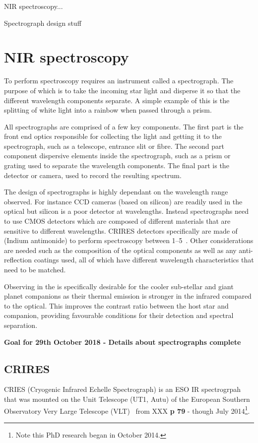 
NIR spectroscopy...

Spectrograph design stuff


\section{NIR spectroscopy}
To perform spectroscopy requires an instrument called a spectrograph. The purpose of which is to take the incoming star light and disperse it so that the different wavelength components separate. A simple example of this is the splitting of white light into a rainbow when passed through a prism.

All spectrographs are comprised of a few key components.
The first part is the front end optics responsible for collecting the light and getting it to the spectrograph, such as a telescope, entrance slit or fibre.
The second part component dispersive elements inside the spectrograph, such as a prism or grating used to separate the wavelength components.
The final part is the detector or camera, used to record the resulting spectrum.

The design of spectrographs is highly dependant on the wavelength range observed. For instance {CCD} cameras (based on silicon) are readily used in the optical but silicon is a poor detector at \nir{} wavelengths.
Instead \nir{} spectrographs need to use CMOS detectors which are composed of different materials that are sensitive to different wavelengths.
{CRIRES} detectors specifically are made of  (Indium antimonide) to perform spectroscopy between 1--5\um{}~\cite{dorn_crires_2004}.
Other considerations are needed such as the composition of the optical components as well as any anti-reflection coatings used, all of which have different wavelength characteristics that need to be matched.





Observing in the \nir{} is specifically desirable for the cooler sub-stellar and giant planet companions as their thermal emission is stronger in the infrared compared to the optical.
This improves the contrast ratio between the host star and companion, providing favourable conditions for their detection and spectral separation.


\textbf{Goal for 29th October 2018 - Details about spectrographs complete }

\subsection{CRIRES}
CRIES (Cryogenic Infrared Echelle Spectrograph) is an ESO IR spectrogrpah that was mounted on the Unit Telescope (UT1, Autu) of the European Southern Observatory Very Large Telescope (VLT)~\citep{kaeufl 2004 } from XXX \textbf{p 79} - though July 2014\footnote{Note this PhD research began in October 2014.}.

